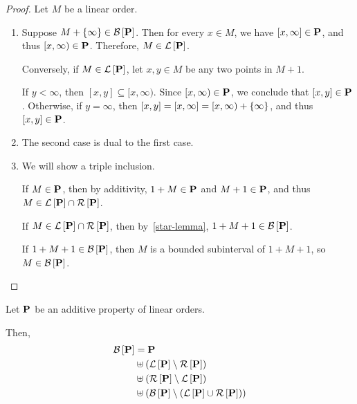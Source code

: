 \begin{proof}
  Let $M$ be a linear order.

  \begin{enumerate}
    \item
          Suppose $M + \left\{ {\infty} \right\} \in \mathcal{B} \left[ {{\mathbf{P}}} \right]$.
          Then for every $x \in M$, we have $[x, \infty] \in \mathbf{P}$,
          and thus $[x, \infty) \in \mathbf{P}$.
          Therefore, $M \in \mathcal{L} \left[ {{\mathbf{P}}} \right]$.

          Conversely, if $M \in \mathcal{L} \left[ {{\mathbf{P}}} \right]$,
          let $x, y \in M$ be any two points in $M + 1$.

          If $y < \infty$, then $[x, y] \subseteq [x, \infty)$.
          Since $[x, \infty) \in \mathbf{P}$, we conclude that $[x, y] \in \mathbf{P}$.
          Otherwise, if $y = \infty$, then $[x, y] = [x, \infty] = [x, \infty) + \left\{ {\infty} \right\}$, and thus $[x, y] \in \mathbf{P}$.

    \item
          The second case is dual to the first case.

    \item
          We will show a triple inclusion.

          If $M \in \mathbf{P}$, then by additivity,
          $1 + M \in \mathbf{P}$ and $M + 1 \in \mathbf{P}$,
          and thus $M \in \mathcal{L} \left[ {{\mathbf{P}}} \right] \cap \mathcal{R} \left[ {{\mathbf{P}}} \right]$.

          If $M \in \mathcal{L} \left[ {{\mathbf{P}}} \right] \cap \mathcal{R} \left[ {{\mathbf{P}}} \right]$, then by~\cref{star-lemma},
          $1 + M + 1 \in \mathcal{B} \left[ {{\mathbf{P}}} \right]$.

          If $1 + M + 1 \in \mathcal{B} \left[ {{\mathbf{P}}} \right]$, then $M$ is a bounded
          subinterval of $1 + M + 1$, so $M \in \mathcal{B} \left[ {{\mathbf{P}}} \right]$.
  \end{enumerate}
\end{proof}

\begin{lemma}
  Let $\mathbf{P}$ be an additive property of linear orders.

  Then,
  \begin{align*}
    \mathcal{B} \left[ {{\mathbf{P}}} \right] & = \mathbf{P}                                                            \\
                  & \uplus \left( {\mathcal{L} \left[ {{\mathbf{P}}} \right] \setminus \mathcal{R} \left[ {{\mathbf{P}}} \right]} \right)                          \\
                  & \uplus \left( {\mathcal{R} \left[ {{\mathbf{P}}} \right] \setminus \mathcal{L} \left[ {{\mathbf{P}}} \right]} \right)                          \\
                  & \uplus \left( { \mathcal{B} \left[ {{\mathbf{P}}} \right] \setminus \left( {\mathcal{L} \left[ {{\mathbf{P}}} \right] \cup \mathcal{R} \left[ {{\mathbf{P}}} \right]} \right)} \right)
  \end{align*}
\end{lemma}

